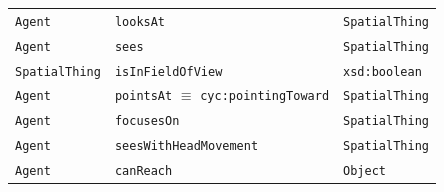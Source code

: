 \documentclass[compress]{beamer}
\newcommand{\concept}[1]{{\scriptsize \texttt{#1}}}
\begin{document}
\begin{frame}{}
\begin{tabular}{p{1.5cm}lp{2cm}}
            \hline
            \concept{Agent}  & \concept{looksAt}  & \concept{SpatialThing} \\
            \concept{Agent}  & \concept{sees}  &  \concept{SpatialThing}  \\ 
            \concept{SpatialThing}  & \concept{isInFieldOfView}  & \concept{xsd:boolean}  \\ 
            \concept{Agent}  & \concept{pointsAt} $\equiv$ \concept{cyc:pointingToward}  & \concept{SpatialThing} \\ 
            \concept{Agent}  & \concept{focusesOn}  &  \concept{SpatialThing}  \\ 
            \concept{Agent} & \concept{seesWithHeadMovement} &  \concept{SpatialThing} \\
            \concept{Agent} & \concept{canReach} &  \concept{Object} \\ 

        \end{tabular}

\end{frame}
\end{document}
